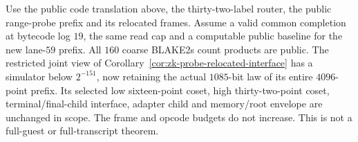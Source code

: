 \begin{corollary}\label{cor:zk-large-code-interface}
Use the public code translation above, the thirty-two-label router, the public range-probe prefix and its relocated frames. Assume a valid common completion at bytecode log $19$, the same read cap and a computable public baseline for the new lane-$59$ prefix. All $160$ coarse BLAKE2s count products are public. The restricted joint view of Corollary~\ref{cor:zk-probe-relocated-interface} has a simulator below $2^{-151}$, now retaining the actual $1085$-bit law of its entire $4096$-point prefix. Its selected low sixteen-point coset, high thirty-two-point coset, terminal/final-child interface, adapter child and memory/root envelope are unchanged in scope. The frame and opcode budgets do not increase. This is not a full-guest or full-transcript theorem.
\end{corollary}
